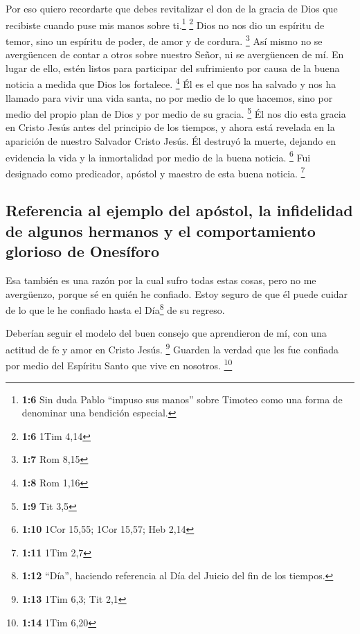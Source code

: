  Por eso quiero recordarte que debes revitalizar el don de
la gracia de Dios que recibiste cuando puse mis manos sobre
ti.\footnote{\textbf{1:6} Sin duda Pablo ``impuso sus manos'' sobre
  Timoteo como una forma de denominar una bendición especial.}
\footnote{\textbf{1:6} 1Tim 4,14}  Dios no nos dio un
espíritu de temor, sino un espíritu de poder, de amor y de cordura.
\footnote{\textbf{1:7} Rom 8,15}  Así mismo no se
avergüencen de contar a otros sobre nuestro Señor, ni se avergüencen de
mí. En lugar de ello, estén listos para participar del sufrimiento por
causa de la buena noticia a medida que Dios los fortalece. \footnote{\textbf{1:8}
  Rom 1,16}  Él es el que nos ha salvado y nos ha llamado
para vivir una vida santa, no por medio de lo que hacemos, sino por
medio del propio plan de Dios y por medio de su gracia. \footnote{\textbf{1:9}
  Tit 3,5}  Él nos dio esta gracia en Cristo Jesús antes
del principio de los tiempos, y ahora está revelada en la aparición de
nuestro Salvador Cristo Jesús. Él destruyó la muerte, dejando en
evidencia la vida y la inmortalidad por medio de la buena noticia.
\footnote{\textbf{1:10} 1Cor 15,55; 1Cor 15,57; Heb 2,14}
 Fui designado como predicador, apóstol y maestro de esta
buena noticia. \footnote{\textbf{1:11} 1Tim 2,7}

\hypertarget{referencia-al-ejemplo-del-apuxf3stol-la-infidelidad-de-algunos-hermanos-y-el-comportamiento-glorioso-de-onesuxedforo}{%
\subsection{Referencia al ejemplo del apóstol, la infidelidad de algunos
hermanos y el comportamiento glorioso de
Onesíforo}\label{referencia-al-ejemplo-del-apuxf3stol-la-infidelidad-de-algunos-hermanos-y-el-comportamiento-glorioso-de-onesuxedforo}}

 Esa también es una razón por la cual sufro todas estas
cosas, pero no me avergüenzo, porque sé en quién he confiado. Estoy
seguro de que él puede cuidar de lo que le he confiado hasta el
Día\footnote{\textbf{1:12} ``Día'', haciendo referencia al Día del
  Juicio del fin de los tiempos.} de su regreso.

 Deberían seguir el modelo del buen consejo que
aprendieron de mí, con una actitud de fe y amor en Cristo Jesús.
\footnote{\textbf{1:13} 1Tim 6,3; Tit 2,1}  Guarden la
verdad que les fue confiada por medio del Espíritu Santo que vive en
nosotros. \footnote{\textbf{1:14} 1Tim 6,20}

